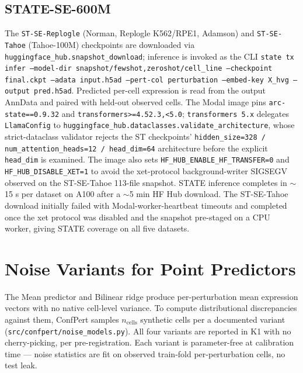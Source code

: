 \documentclass{article}
\begin{document}
\subsection{STATE-SE-600M \citep{adduri2025state}}
The \texttt{ST-SE-Replogle} (Norman, Replogle K562/RPE1, Adamson) and \texttt{ST-SE-Tahoe} (Tahoe-100M) checkpoints are downloaded via \texttt{huggingface\_hub.snapshot\_download}; inference is invoked as the CLI \texttt{state tx infer --model-dir {snapshot}/{fewshot,zeroshot}/{cell\_line} --checkpoint final.ckpt --adata input.h5ad --pert-col perturbation --embed-key X\_hvg --output pred.h5ad}. Predicted per-cell expression is read from the output AnnData and paired with held-out observed cells. The Modal image pins \texttt{arc-state==0.9.32} and \texttt{transformers>=4.52.3,<5.0}; \texttt{transformers~5.x} delegates \texttt{LlamaConfig} to \texttt{huggingface\_hub.dataclasses.validate\_architecture}, whose strict-dataclass validator rejects the ST checkpoints' \texttt{hidden\_size=328 / num\_attention\_heads=12 / head\_dim=64} architecture before the explicit \texttt{head\_dim} is examined. The image also sets \texttt{HF\_HUB\_ENABLE\_HF\_TRANSFER=0} and \texttt{HF\_HUB\_DISABLE\_XET=1} to avoid the xet-protocol background-writer SIGSEGV observed on the ST-SE-Tahoe 113-file snapshot. STATE inference completes in $\sim$15 s per dataset on A100 after a $\sim$5 min HF Hub download. The ST-SE-Tahoe download initially failed with Modal-worker-heartbeat timeouts and completed once the xet protocol was disabled and the snapshot pre-staged on a CPU worker, giving STATE coverage on all five datasets.

\section{Noise Variants for Point Predictors}
\label{app:noise}

The Mean predictor and Bilinear ridge produce per-perturbation mean expression vectors with no native cell-level variance. To compute distributional discrepancies against them, ConfPert samples $n_{\text{cells}}$ synthetic cells per a documented variant (\texttt{src/confpert/noise\_models.py}). All four variants are reported in K1 with no cherry-picking, per pre-registration. Each variant is parameter-free at calibration time --- noise statistics are fit on observed train-fold per-perturbation cells, no test leak.
\end{document}

